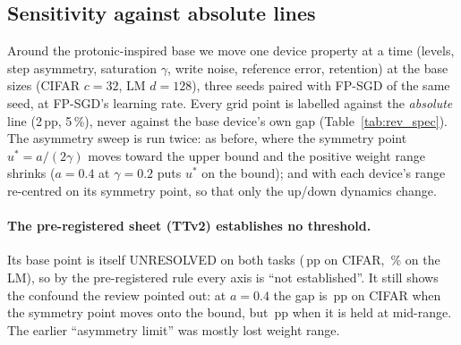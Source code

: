 \subsection{Sensitivity against absolute lines}\label{sec:spec}

Around the protonic-inspired base we move one device property at a time (levels, step asymmetry, saturation $\gamma$, write
noise, reference error, retention) at the base sizes (CIFAR $c=32$, LM $d=128$), three seeds paired with FP-SGD of the same seed,
at FP-SGD's learning rate. Every grid point is labelled against the \emph{absolute} line (2\,pp, 5\,\%), never against the base
device's own gap (Table~\ref{tab:rev_spec}). The asymmetry sweep is run twice: as before, where the symmetry point
$u^*=a/(2\gamma)$ moves toward the upper bound and the positive weight range shrinks ($a=0.4$ at $\gamma=0.2$ puts $u^*$ on the
bound); and with each device's range re-centred on its symmetry point, so that only the up/down dynamics change.

\paragraph{The pre-registered sheet (TTv2) establishes no threshold.} Its base point is itself UNRESOLVED on both tasks
(\RVSpecTtvTwoCifarBaseGap\,pp on CIFAR, \RVSpecTtvTwoLmBaseGap\,\% on the LM), so by the pre-registered rule every axis is ``not
established''. It still shows the confound the review pointed out: at $a=0.4$ the gap is \RVSpecTtvTwoCifarAsymAtZeroPFourGap\,pp
on CIFAR when the symmetry point moves onto the bound, but \RVSpecTtvTwoCifarAsymFixedspAtZeroPFourGap\,pp when it is held at
mid-range. The earlier ``asymmetry limit'' was mostly lost weight range.


